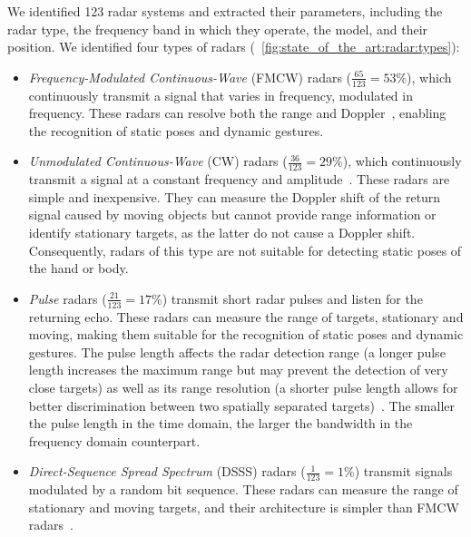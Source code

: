 We identified 123 radar systems and extracted their parameters, including the radar type, the frequency band in which they operate, the model, and their position. We identified four types of radars (\fig~\ref{fig:state_of_the_art:radar:types}): 
\begin{itemize}
    \item \textit{Frequency-Modulated Continuous-Wave} (FMCW) radars ($\frac{65}{123}{=}53\%$), which continuously transmit a signal that varies in frequency, \ie modulated in frequency. These radars can resolve both the range and Doppler~\cite{AlHourani:2018}, enabling the recognition of static poses and dynamic gestures.
    
    \item \textit{Unmodulated Continuous-Wave} (CW) radars ($\frac{36}{123}{=}29\%$), which continuously transmit a signal at a constant frequency and amplitude~\cite{Oberhammer:2013}. These radars are simple and inexpensive. They can measure the Doppler shift of the return signal caused by moving objects but cannot provide range information or identify stationary targets, as the latter do not cause a Doppler shift. Consequently, radars of this type are not suitable for detecting static poses of the hand or body.
    
    \item \textit{Pulse} radars ($\frac{21}{123}{=}17\%$) transmit short radar pulses and listen for the returning echo. These radars can measure the range of targets, stationary and moving, making them suitable for the recognition of static poses and dynamic gestures. The pulse length affects the radar detection range (a longer pulse length increases the maximum range but may prevent the detection of very close targets) as well as its range resolution (a shorter pulse length allows for better discrimination between two spatially separated targets)~\cite{Bole:2014}. The smaller the pulse length in the time domain, the larger the bandwidth in the frequency domain counterpart.
    
    \item  \textit{Direct-Sequence Spread Spectrum} (DSSS) radars ($\frac{1}{123}{=}1\%$)  transmit signals modulated by a random bit sequence. These radars can measure the range of stationary and moving targets, and their architecture is simpler than FMCW radars~\cite{Tang:2020}.
\end{itemize}

